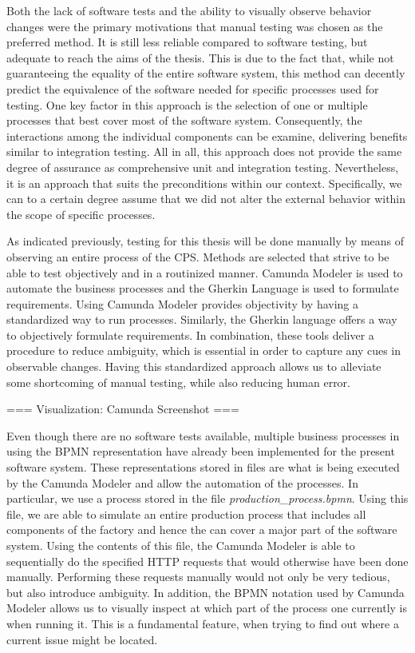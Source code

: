Both the lack of software tests and the ability to visually observe behavior changes were the primary motivations that manual testing was chosen as the preferred method. It is still less reliable compared to software testing, but adequate to reach the aims of the thesis. This is due to the fact that, while not guaranteeing the equality of the entire software system, this method can decently predict the equivalence of the software needed for specific processes used for testing. One key factor in this approach is the selection of one or multiple processes that best cover most of the software system. Consequently, the interactions among the individual components can be examine, delivering benefits similar to integration testing. All in all, this approach does not provide the same degree of assurance as comprehensive unit and integration testing. Nevertheless, it is an approach that suits the preconditions within our context. Specifically, we can to a certain degree assume that we did not alter the external behavior within the scope of specific processes. 


As indicated previously, testing for this thesis will be done manually by means of observing an entire process of the CPS. Methods are selected that strive to be able to test objectively and in a routinized manner. Camunda Modeler is used to automate the business processes and the Gherkin Language is used to formulate requirements. Using Camunda Modeler provides objectivity by having a standardized way to run processes. Similarly, the Gherkin language offers a way to objectively formulate requirements. In combination, these tools deliver a procedure to reduce ambiguity, which is essential in order to capture any cues in observable changes. Having this standardized approach allows us to alleviate some shortcoming of manual testing, while also reducing human error.

=== Visualization: Camunda Screenshot ===

Even though there are no software tests available, multiple business processes in using the BPMN representation have already been implemented for the present software system. These representations stored in files are what is being executed by the Camunda Modeler and allow the automation of the processes.  In particular, we use a process stored in the file \emph{production\_process.bpmn}. Using this file, we are able to simulate an entire production process that includes all components of the factory and hence the can cover a major part of the software system. Using the contents of this file, the Camunda Modeler is able to sequentially do the specified HTTP requests that would otherwise have been done manually. Performing these requests manually would not only be very tedious, but also introduce ambiguity. In addition, the BPMN notation used by Camunda Modeler allows us to visually inspect at which part of the process one currently is when running it. This is a fundamental feature, when trying to find out where a current issue might be located.



